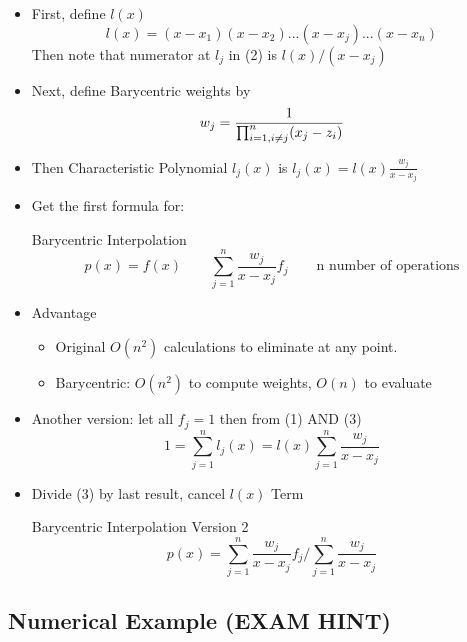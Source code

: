 \begin{itemize}
    \item First, define $l(x)$
    \[ l(x) = (x-x_1)(x-x_2)...(x-x_j)...(x-x_n)\]
    Then note that numerator at $l_j$ in (2) is $l(x)/(x-x_j)$
    \item Next, define Barycentric weights by
    \[w_j = \frac{1}{\prod_{i=1, \space i \neq j}^n (x_j-z_i)}\]

    \item Then Characteristic Polynomial $l_j(x)$ is $l_j(x) = l(x) \frac{w_j}{x-x_j}$

    \item Get the first formula for:
    
    \begin{thmbox}{Barycentric Interpolation}
        \begin{equation}
            p(x) = f(x) \qquad \sum_{j=1}^n \frac{w_j}{x-x_j} f_j \qquad \text{n number of operations}
        \end{equation}
    \end{thmbox}



    \item Advantage 
    \begin{itemize}
        \item Original $O(n^2)$ calculations to eliminate at any point.
        \item Barycentric: $O(n^2)$ to compute weights, $O(n)$ to evaluate
    \end{itemize}
    
    \item Another version: let all $f_j = 1$ then from (1) AND (3)
    \[1 = \sum_{j=1}^n l_j (x) = l(x)\sum_{j=1}^n \frac{w_j}{x-x_j}\]

    \item Divide (3) by last result, cancel $l(x)$ Term

    \begin{thmbox}{Barycentric Interpolation Version 2}
        \begin{equation}
            p(x) = \sum_{j=1}^n \frac{w_j}{x-x_j} f_j / \sum_{j=1}^n \frac{w_j}{x-x_j}
        \end{equation}
    \end{thmbox}
\end{itemize}

\subsection{Numerical Example (EXAM HINT)}

